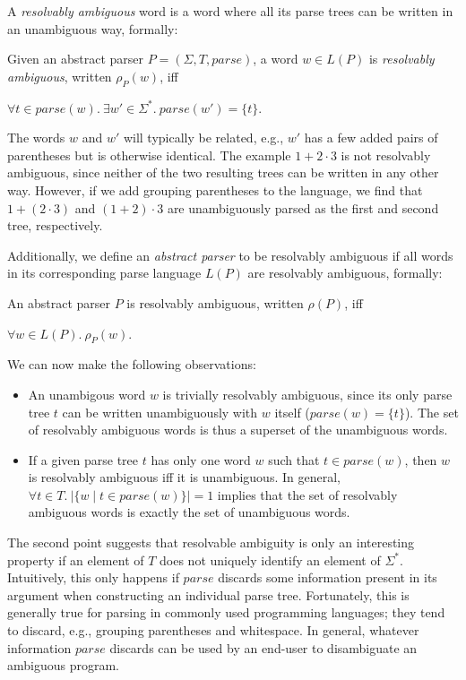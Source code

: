 \documentclass[runningheads]{llncs}
\newcommand{\T}{\Sigma} %
\newcommand{\parse}{\mathit{parse}} %
\begin{document}
\noindent A \emph{resolvably ambiguous} word is a word where all its parse trees can be written in an unambiguous way, formally:

\begin{definition}\label{def:resolvable-word}
  Given an abstract parser $P = (\T, T, \parse)$, a word $w \in L(P)$ is \emph{resolvably ambiguous}, written $\rho_P(w)$, iff

  $\forall t \in \parse(w).\ \exists w' \in \T^{*}.\ \parse(w') = \{t\}$.
\end{definition}

The words $w$ and $w'$ will typically be related, e.g., $w'$ has a few added pairs of parentheses but is otherwise identical.
The example $1 + 2 \cdot 3$
is not resolvably ambiguous, since neither of the two resulting trees can be written in any other way. However, if we add grouping parentheses to the language, we find that $1 + (2 \cdot 3)$ and $(1 + 2) \cdot 3$ are unambiguously parsed as the first and second tree, respectively.

Additionally, we define an \emph{abstract parser} to be resolvably ambiguous if all words in its corresponding parse language $L(P)$ are resolvably ambiguous, formally:

\begin{definition}\label{def:resolvable-language}
  An abstract parser $P$ is resolvably ambiguous, written $\rho(P)$, iff

  $\forall w \in L(P).\ \rho_P(w)$.
\end{definition}

\noindent We can now make the following observations:

\begin{itemize}
\item An unambigous word $w$ is trivially resolvably ambiguous, since its only parse tree $t$ can be written unambiguously with $w$ itself ($\parse(w) = \{t\}$). The set of resolvably ambiguous words is thus a superset of the unambiguous words.
\item If a given parse tree $t$ has only one word $w$ such that $t \in \parse(w)$, then $w$ is resolvably ambiguous iff it is unambiguous. In general, $\forall t \in T.\ \lvert\{w \mid t \in \parse(w)\}\rvert = 1$ implies that the set of resolvably ambiguous words is exactly the set of unambiguous words.
\end{itemize}

\noindent The second point suggests that resolvable ambiguity is only an interesting property if an element of $T$ does not uniquely identify an element of $\T^{*}$. Intuitively, this only happens if $\parse$ discards some information present in its argument when constructing an individual parse tree. Fortunately, this is generally true for parsing in commonly used programming languages; they tend to discard, e.g., grouping parentheses and whitespace. In general, whatever information $\parse$ discards can be used by an end-user to disambiguate an ambiguous program.
\end{document}
